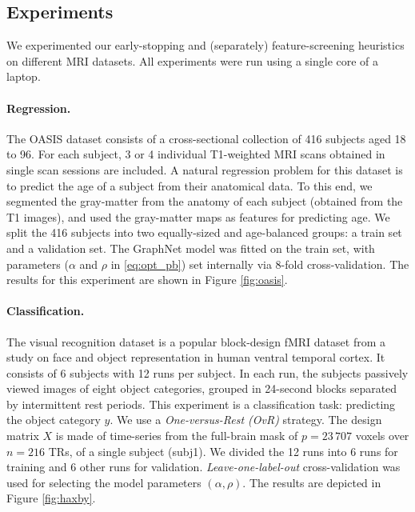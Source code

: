 \subsection{Experiments}
We experimented our early-stopping and (separately)
feature-screening heuristics on different MRI datasets.
All experiments were run using a single core of
  a laptop.

\paragraph{Regression.} The OASIS dataset
    \citep{marcus2007open} consists of a
    cross-sectional collection of 416 subjects aged 18 to 96. For each
    subject, 3 or 4 individual T1-weighted MRI scans obtained in
    single scan sessions are included.   A natural regression problem
    for this dataset is to predict the age of a subject from their
    anatomical data. To this end, we segmented the gray-matter from
    the anatomy of each subject (obtained from the T1 images), and
    used the gray-matter maps
    as features for predicting age. We split the 416 subjects into two
    equally-sized and age-balanced groups: a train set and a validation
    set. The GraphNet model \citep{hebiri2011,grosenick2013} was fitted
    on the train set, with parameters
    ($\alpha$ and $\rho$ in \eqref{eq:opt_pb}) set internally via 8-fold
    cross-validation. The results for this experiment are shown in
    Figure \ref{fig:oasis}.

\paragraph{Classification.} The visual
    recognition dataset \citep{haxby2001} is a popular block-design
    fMRI dataset from a
    study on face and object representation in human ventral temporal
    cortex.
It consists of 6 subjects with 12 runs per subject. In each run, the
subjects
passively viewed images of eight object categories, grouped
in 24-second blocks separated by intermittent rest periods. This
experiment is a classification task: predicting the object category
$y$. We use a \textit{One-versus-Rest (OvR)} strategy. The design
matrix ${X}$ is made of
time-series from the full-brain mask of $p = 23\,707$ voxels over $n =
216$ TRs, of a single subject (subj1). We divided the 12 runs into 6
runs for training and 6 other runs for
validation. \textit{Leave-one-label-out} cross-validation was used for
selecting the model parameters $(\alpha, \rho)$. The results are
depicted in Figure \ref{fig:haxby}.

